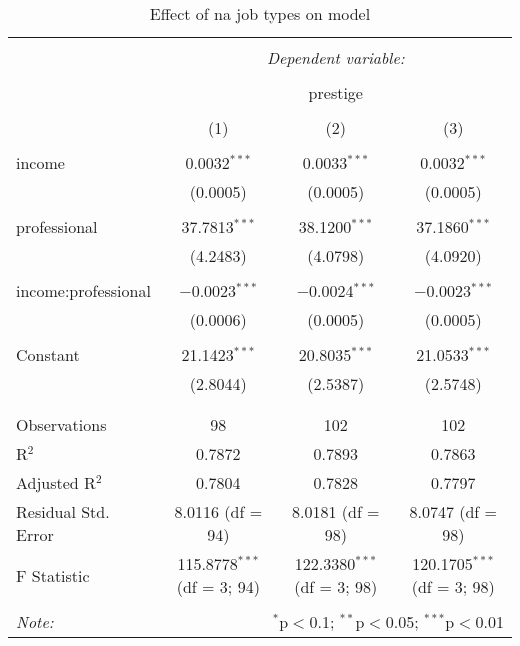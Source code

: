 
\begin{table}[!htbp] \centering 
  \caption{Effect of na job types on model} 
  \label{tab:pres_nas} 
\begin{tabular}{@{\extracolsep{5pt}}lccc} 
\\[-1.8ex]\hline 
\hline \\[-1.8ex] 
 & \multicolumn{3}{c}{\textit{Dependent variable:}} \\ 
\cline{2-4} 
\\[-1.8ex] & \multicolumn{3}{c}{prestige} \\ 
\\[-1.8ex] & (1) & (2) & (3)\\ 
\hline \\[-1.8ex] 
 income & 0.0032$^{***}$ & 0.0033$^{***}$ & 0.0032$^{***}$ \\ 
  & (0.0005) & (0.0005) & (0.0005) \\ 
  & & & \\ 
 professional & 37.7813$^{***}$ & 38.1200$^{***}$ & 37.1860$^{***}$ \\ 
  & (4.2483) & (4.0798) & (4.0920) \\ 
  & & & \\ 
 income:professional & $-$0.0023$^{***}$ & $-$0.0024$^{***}$ & $-$0.0023$^{***}$ \\ 
  & (0.0006) & (0.0005) & (0.0005) \\ 
  & & & \\ 
 Constant & 21.1423$^{***}$ & 20.8035$^{***}$ & 21.0533$^{***}$ \\ 
  & (2.8044) & (2.5387) & (2.5748) \\ 
  & & & \\ 
\hline \\[-1.8ex] 
Observations & 98 & 102 & 102 \\ 
R$^{2}$ & 0.7872 & 0.7893 & 0.7863 \\ 
Adjusted R$^{2}$ & 0.7804 & 0.7828 & 0.7797 \\ 
Residual Std. Error & 8.0116 (df = 94) & 8.0181 (df = 98) & 8.0747 (df = 98) \\ 
F Statistic & 115.8778$^{***}$ (df = 3; 94) & 122.3380$^{***}$ (df = 3; 98) & 120.1705$^{***}$ (df = 3; 98) \\ 
\hline 
\hline \\[-1.8ex] 
\textit{Note:}  & \multicolumn{3}{r}{$^{*}$p$<$0.1; $^{**}$p$<$0.05; $^{***}$p$<$0.01} \\ 
\end{tabular} 
\end{table}  
